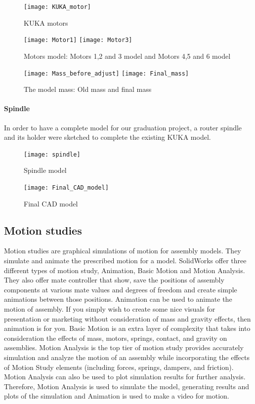 \begin{figure}[H]
	\centering
	\texttt{[image: KUKA\_motor]}
	\caption{KUKA motors}
\end{figure}

\begin{figure}[H]
		\centering
		\texttt{[image: Motor1]}
		\texttt{[image: Motor3]}
	\caption{Motors model: Motors 1,2 and 3 model and Motors 4,5 and 6 model}
	\label{fig:fig}
\end{figure}

\begin{figure}[H]
		\centering
		\texttt{[image: Mass\_before\_adjust]}
		\texttt{[image: Final\_mass]}
	\caption{The model mass: Old mass and final mass}
	\label{fig:fig22}
\end{figure}

\paragraph{Spindle}
In order to have a complete model for our graduation project, a router spindle and its holder were sketched to complete the existing KUKA model.

\begin{figure}[H]
	\centering
	\texttt{[image: spindle]}
	\caption{Spindle model}
\end{figure}

\begin{figure}[H]
	\centering
	\texttt{[image: Final\_CAD\_model]}
	\caption{Final CAD model}
\end{figure}

\subsection{Motion studies}
Motion studies are graphical simulations of motion for assembly models. They simulate and animate the prescribed motion for a model. SolidWorks offer three different types of motion study, Animation, Basic Motion and Motion Analysis. They also offer mate controller that show, save the positions of assembly components at various mate values and degrees of freedom and create simple animations between those positions.
\smallskip
\newline Animation can be used to animate the motion of assembly. If you simply wish to create some nice visuals for presentation or marketing without consideration of mass and gravity effects, then animation is for you. 
\newline Basic Motion is an extra layer of complexity that takes into consideration the effects of mass, motors, springs, contact, and gravity on assemblies. 
\smallskip
\newline Motion Analysis is the top tier of motion study provides accurately simulation and analyze the motion of an assembly while incorporating the effects of Motion Study elements (including forces, springs, dampers, and friction). Motion Analysis can also be used to plot simulation results for further analysis.
\smallskip
\newline Therefore, Motion Analysis is used to simulate the model, generating results and plots of the simulation and Animation is used to make a video for motion.

